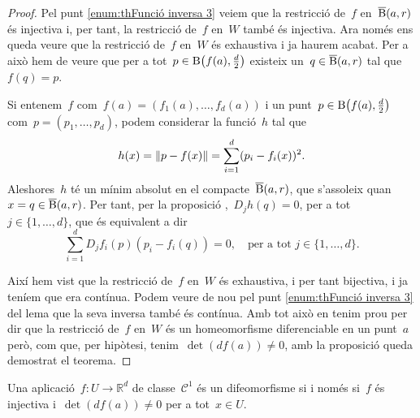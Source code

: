 \documentclass[../../main.tex]{subfiles}
\begin{document}
\begin{theorem}
\begin{proof}
            Pel punt \eqref{enum:thFunció inversa 3} veiem que la restricció de~\(f\) en~\(\overline{\operatorname{B}}(a,r)\) és injectiva i, per tant, la restricció de~\(f\) en~\(W\) també és injectiva.
            Ara només ens queda veure que la restricció de~\(f\) en~\(W\) és exhaustiva i ja haurem acabat.
            Per a això hem de veure que per a tot~\(p\in\B\left(f(a),\tfrac{d}{2}\right)\) existeix un~\(q\in\overline{\operatorname{B}}(a,r)\) tal que~\(f(q)=p\).

            Si entenem~\(f\) com~\(f(a)=(f_{1}(a),\dots,f_{d}(a))\) i un punt~\(p\in\B\left(f(a),\tfrac{d}{2}\right)\) com~\(p=(p_{1},\dots,p_{d})\), podem considerar la funció~\(h\) tal que
            \[
                h(x)=\norm{p-f(x)}=\sum_{i=1}^{d}(p_{i}-f_{i}(x))^{2}.
            \]
            Aleshores~\(h\) té un mínim absolut en el compacte~\(\overline{\operatorname{B}}(a,r)\), que s'assoleix quan~\(x=q\in\overline{\operatorname{B}}(a,r)\).
            Per tant, per la proposició ,~\(D_{j}h(q)=0\), per a tot~\(j\in\{1,\dots,d\}\), que és equivalent a dir
            \[
                \sum_{i=1}^{d}D_{j}f_{i}(p)(p_{i}-f_{i}(q))=0,\quad\text{per a tot }j\in\{1,\dots,d\}.
            \]

            Així hem vist que la restricció de~\(f\) en~\(W\) és exhaustiva, i per tant bijectiva, i ja teníem que era contínua.
            Podem veure de nou pel punt \eqref{enum:thFunció inversa 3} del lema  que la seva inversa també és contínua.
            Amb tot això en tenim prou per dir que la restricció de~\(f\) en~\(W\) és un homeomorfisme diferenciable en un punt~\(a\) però, com que, per hipòtesi, tenim~\(\det(df(a))\neq0\), amb la proposició  queda demostrat el teorema.
        \end{proof}
    \end{theorem}
    \begin{corollary} %
        \label{cor:difeomorfisme és equivalent a ser injectiva i tenir diferencial amb determinant no nul}
        Una aplicació~\(f\colon U\to \mathbb{R}^{d}\) de classe~\(\mathcal{C}^{1}\) és un difeomorfisme si i només si~\(f\) és injectiva i~\(\det(df(a))\neq0\) per a tot~\(x\in U\).
    \end{corollary}
\end{document}
